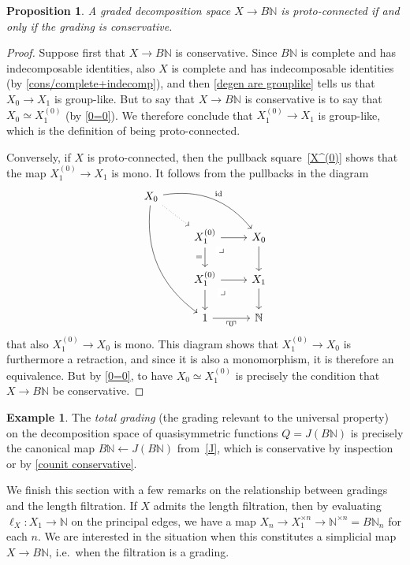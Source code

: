\documentclass{amsart}
\newcommand{\proto}{proto}
\DeclareMathOperator{\id}{id}
\newcommand{\N}{\mathbb{N}}
\newcommand{\drpullback}{\arrow[phantom]{dr}[very near start,description]{\lrcorner}}
\newcommand{\name}[1]{\ulcorner \!#1\! \urcorner}
\newtheorem{proposition}[theorem]{Proposition}
\theoremstyle{definition}
\newtheorem{example}[theorem]{Example}
\theoremstyle{noname}
\begin{document}
\begin{proposition}\label{proto-connected = conservative}
  A graded decomposition space $X \to B\N$ is \proto-connected if and only if
  the grading is conservative.
\end{proposition}

\begin{proof}
  Suppose first that $X\to B\N$ is conservative.
  Since $B\N$ is complete and has indecomposable identities, 
  also $X$ is complete and has indecomposable identities (by  \cref{cons/complete+indecomp}), and then \cref{degen are grouplike}
  tells us 
  that $X_0 \to X_1$ is group-like. But to say that $X\to B\N$ is conservative is
  to say that $X_0 \simeq X_1^{(0)}$ (by \cref{0=0}). We therefore conclude that $X_1^{(0)}\to 
  X_1$ is group-like, which is the definition of being \proto-connected.
  
  Conversely, if $X$ is \proto-connected,
  then {the pullback square~\eqref{X^(0)} shows that} the map $X_1^{(0)} \to X_1$ is mono.
  It follows from the pullbacks in the diagram
  \[
  \begin{tikzcd}
  X_0 \ar[rrd, bend left, "\id"] \ar[rddd, bend right] \ar[rd, dotted] & &  \\
  & X_1^{(0)} \drpullback \ar[r] \ar[d, "="'] & X_0 \ar[d] \\
  & X_1^{(0)} \drpullback \ar[r] \ar[d] & X_1 \ar[d] \\
  & 1 \ar[r, "\name 0"'] & \N 
  \end{tikzcd}
  \]
  that also $X_1^{(0)} \to X_0$ is mono.
  This diagram shows that $X_1^{(0)} \to X_0$ is furthermore a retraction, 
  and since it is also a monomorphism, it is therefore an
  equivalence. But by \cref{0=0}, to have $X_0 \simeq X_1^{(0)}$ is precisely the condition that $X\to B\N$ be conservative.
\end{proof}





\begin{example}\label{ex:Q-grading}
  The {\em total grading} (the grading relevant to the universal property) on the decomposition space of quasisymmetric functions
  $Q = J(B\N)$  is precisely the
  canonical map $B\N \leftarrow J(B\N)$ from~\ref{J}, which is conservative by inspection or by \cref{counit conservative}.
\end{example}


We finish this section with a few remarks on the relationship between gradings and the
length filtration.
If $X$ admits the length filtration, then by evaluating $\ell_X \colon X_1 \to \N$ on the principal edges, we have a map $X_n \to X_1^{\times n} \to \N^{\times n} = B\N_n$ for each $n$.
We are interested in the situation when this constitutes a simplicial map $X\to B\N$, i.e.\ when the filtration is a grading.
\end{document}
